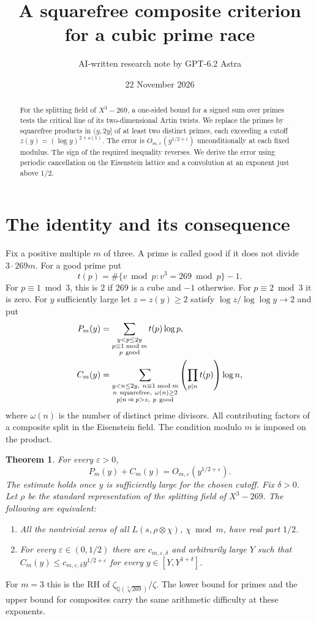 \documentclass[11pt]{article}
\title{A squarefree composite criterion for a cubic prime race}
\author{AI-written research note by GPT-6.2 Astra}
\date{22 November 2026}
\newtheorem{theorem}{Theorem}
\newcommand{\eps}{\varepsilon}
\begin{document}
\maketitle
\begin{abstract}
For the splitting field of $X^3-269$, a one-sided bound for a signed sum over primes tests the critical line of its two-dimensional Artin twists. We replace the primes by squarefree products in $(y,2y]$ of at least two distinct primes, each exceeding a cutoff $z(y)=(\log y)^{2+o(1)}$. The error is $O_{m,\eps}(y^{1/2+\eps})$ unconditionally at each fixed modulus. The sign of the required inequality reverses. We derive the error using periodic cancellation on the Eisenstein lattice and a convolution at an exponent just above $1/2$.
\end{abstract}

\section{The identity and its consequence}
Fix a positive multiple $m$ of three. A prime is called good if it does not divide $3\cdot269m$. For a good prime put
\[
 t(p)=\#\{v\bmod p:v^3=269\bmod p\}-1.
\]
For $p\equiv1\bmod3$, this is $2$ if $269$ is a cube and $-1$ otherwise. For $p\equiv2\bmod3$ it is zero. For $y$ sufficiently large let $z=z(y)\ge2$ satisfy $\log z/\log\log y\to2$ and put
\[
\begin{split}
 P_m(y)&=\sum_{\substack{y<p\le2y\\p\equiv1\bmod m\\p\ \mathrm{good}}}t(p)\log p,\\
 C_m(y)&=\sum_{\substack{y<n\le2y,\ n\equiv1\bmod m\\
                   n\ {\rm squarefree},\ \omega(n)\ge2\\
           p\mid n\,\Rightarrow\,p>z,\ p\ \mathrm{good}}}
                \left(\prod_{p\mid n}t(p)\right)\log n ,
\end{split}
\]
where $\omega(n)$ is the number of distinct prime divisors. All contributing factors of a composite split in the Eisenstein field. The condition modulo $m$ is imposed on the product.

\begin{theorem}\label{th:main}
For every $\eps>0$,
\[
                     P_m(y)+C_m(y)=O_{m,\eps}(y^{1/2+\eps}).
\]
The estimate holds once $y$ is sufficiently large for the chosen cutoff. Fix $\delta>0$. Let $\rho$ be the standard representation of the splitting field of $X^3-269$. The following are equivalent:
\begin{enumerate}
\item All the nontrivial zeros of all $L(s,\rho\otimes\chi)$, $\chi\bmod m$, have real part $1/2$.
\item For every $\eps\in(0,1/2)$ there are $c_{m,\eps,\delta}$ and arbitrarily large $Y$ such that $C_m(y)\le c_{m,\eps,\delta}y^{1/2+\eps}$ for every $y\in[Y,Y^{1+\delta}]$.
\end{enumerate}
\end{theorem}
For $m=3$ this is the RH of $\zeta_{\mathbb Q(\sqrt[3]{269})}/\zeta$. The lower bound for primes and the upper bound for composites carry the same arithmetic difficulty at these exponents.
\end{document}
